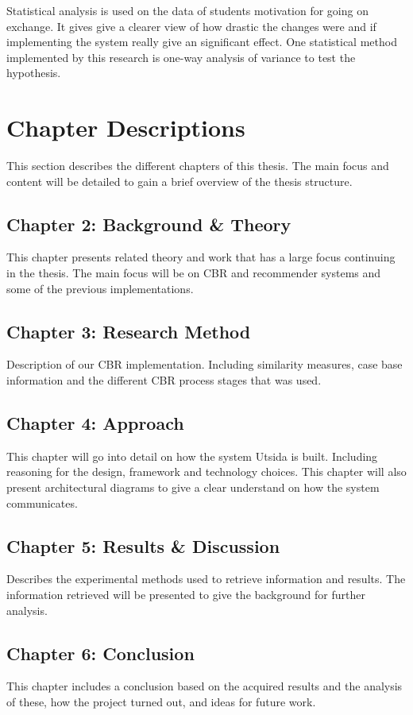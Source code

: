 Statistical analysis is used on the data of students motivation for going on exchange. It gives give a clearer view of how drastic the changes were and if implementing the system really give an significant effect. One statistical method implemented by this research is one-way analysis of variance to test the hypothesis.

\section{Chapter Descriptions}
This section describes the different chapters of this thesis. The main focus and content will be detailed to gain a brief overview of the thesis structure. 

\subsection*{Chapter 2: Background \& Theory}
This chapter presents related theory and work that has a large focus continuing in the thesis. The main focus will be on CBR and recommender systems and some of the previous implementations.  

\subsection*{Chapter 3: Research Method}
Description of our CBR implementation. Including similarity measures, case base information and the different CBR process stages that was used. 

\subsection*{Chapter 4: Approach}
This chapter will go into detail on how the system Utsida is built. Including reasoning for the design, framework and technology choices. This chapter will also present architectural diagrams to give a clear understand on how the system communicates. 

\subsection*{Chapter 5: Results \& Discussion}
Describes the experimental methods used to retrieve information and results. The information retrieved will be presented to give the background for further analysis.

\subsection*{Chapter 6: Conclusion}
This chapter includes a conclusion based on the acquired results and the analysis of these, how the project turned out, and ideas for future work.

\cleardoublepage